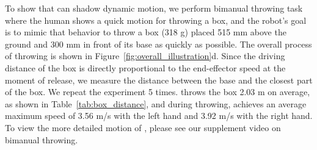 To show that \robot can shadow dynamic motion, we perform bimanual throwing task where the human shows a quick motion for throwing a box, and the robot's goal is to mimic that behavior to throw a box (318 g) placed 515 mm above the ground and 300 mm in front of its base as quickly as possible. The overall process of throwing is shown in Figure~\ref{fig:overall_illustration}d. Since the driving distance of the box is directly proportional to the end-effector speed at the moment of release, we measure the distance between the base and the closest part of the box. We repeat the experiment 5 times. \robot throws the box 2.03 m on average, as shown in Table~\ref{tab:box_distance}, and during throwing, \robot achieves an average maximum speed of 3.56 m/s with the left hand and 3.92 m/s with the right hand. To view the more detailed motion of \robot, please see our supplement video on bimanual throwing.